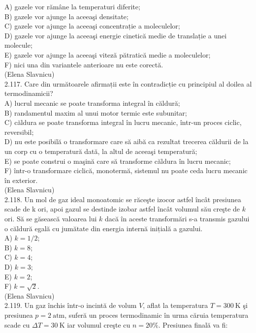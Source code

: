 \documentclass[10pt]{article}
\begin{document}
A) gazele vor rămâne la temperaturi diferite;\\
B) gazele vor ajunge la aceeaşi densitate;\\
C) gazele vor ajunge la aceeaşi concentrație a moleculelor;\\
D) gazele vor ajunge la aceeaşi energie cinetică medie de translație a unei molecule;\\
E) gazele vor ajunge la aceeaşi viteză pătratică medie a moleculelor;\\
F) nici una din variantele anterioare nu este corectă.\\
(Elena Slavnicu)\\
2.117. Care din următoarele afirmații este în contradicție cu principiul al doilea al termodinamicii?\\
A) lucrul mecanic se poate transforma integral în căldură;\\
B) randamentul maxim al unui motor termic este subunitar;\\
C) căldura se poate transforma integral în lucru mecanic, într-un proces ciclic, reversibil;\\
D) nu este posibilă o transformare care să aibă ca rezultat trecerea căldurii de la un corp cu o temperatură dată, la altul de aceeaşi temperatură;\\
E) se poate construi o maşină care să transforme căldura în lucru mecanic;\\
F) într-o transformare ciclică, monotermă, sistemul nu poate ceda lucru mecanic în exterior.\\
(Elena Slavnicu)\\
2.118. Un mol de gaz ideal monoatomic se răceşte izocor astfel încât presiunea scade de k ori, apoi gazul se destinde izobar astfel încât volumul său creşte de $k$ ori. Să se găsească valoarea lui $k$ dacă în aceste transformări s-a transmis gazului o căldură egală cu jumătate din energia internă inițială a gazului.\\
A) $k=1 / 2$;\\
B) $k=8$;\\
C) $k=4$;\\
D) $k=3$;\\
E) $k=2$;\\
F) $k=\sqrt{2}$.\\
(Elena Slavnicu)\\
2.119. Un gaz închis într-o incintă de volum $V$, aflat la temperatura $T=300 \mathrm{~K}$ şi presiunea $p=2 \mathrm{~atm}$, suferă un proces termodinamic în urma căruia temperatura scade cu $\Delta T=30 \mathrm{~K}$ iar volumul creşte cu $n=20 \%$. Presiunea finală va fi:\\
\end{document}
